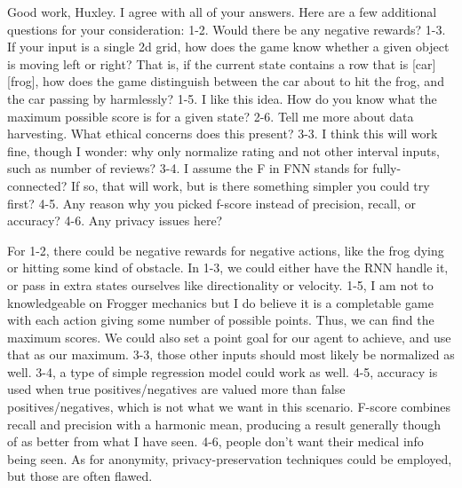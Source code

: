 \documentclass[letterpaper]{article}
\begin{document}
Good work, Huxley. I agree with all of your answers. Here are a few
additional questions for your consideration: 1-2. Would there be any
negative rewards? 1-3. If your input is a single 2d grid, how does the
game know whether a given object is moving left or right? That is, if
the current state contains a row that is [car] [frog], how does the game
distinguish between the car about to hit the frog, and the car passing
by harmlessly? 1-5. I like this idea. How do you know what the maximum
possible score is for a given state? 2-6. Tell me more about data
harvesting. What ethical concerns does this present? 3-3. I think this
will work fine, though I wonder: why only normalize rating and not other
interval inputs, such as number of reviews? 3-4. I assume the F in FNN
stands for fully-connected? If so, that will work, but is there
something simpler you could try first? 4-5. Any reason why you picked
f-score instead of precision, recall, or accuracy? 4-6. Any privacy
issues here?

For 1-2, there could be negative rewards for negative actions, like the
frog dying or hitting some kind of obstacle. In 1-3, we could either
have the RNN handle it, or pass in extra states ourselves like
directionality or velocity. 1-5, I am not to knowledgeable on Frogger
mechanics but I do believe it is a completable game with each action
giving some number of possible points. Thus, we can find the maximum
scores. We could also set a point goal for our agent to achieve, and use
that as our maximum. 3-3, those other inputs should most likely be
normalized as well. 3-4, a type of simple regression model could work as
well. 4-5, accuracy is used when true positives/negatives are valued
more than false positives/negatives, which is not what we want in this
scenario. F-score combines recall and precision with a harmonic mean,
producing a result generally though of as better from what I have seen.
4-6, people don't want their medical info being seen. As for anonymity,
privacy-preservation techniques could be employed, but those are often
flawed.
\end{document}
